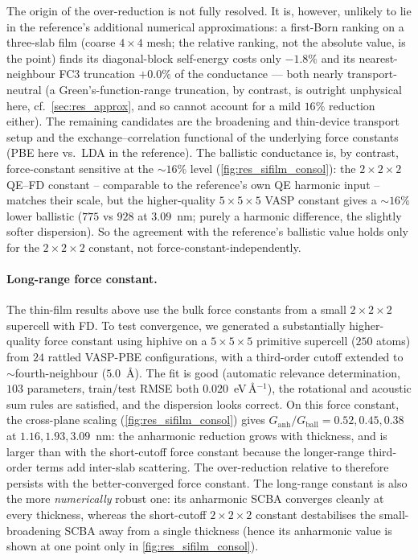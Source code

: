 The origin of the over-reduction is not fully resolved. It is, however,
unlikely to lie in the reference's additional numerical approximations: a
first-Born ranking on a three-slab film (coarse $4\times4$ mesh; the relative
ranking, not the absolute value, is the point) finds its diagonal-block
self-energy costs only
$-1.8\%$ and its nearest-neighbour FC3 truncation $+0.0\%$ of the conductance
--- both nearly transport-neutral (a Green's-function-range truncation, by
contrast, is outright unphysical here, cf.\ \cref{sec:res_approx}, and so cannot
account for a mild $16\%$ reduction either). The remaining candidates are the broadening and thin-device
transport setup and the exchange--correlation functional of the underlying
force constants (PBE here vs.\ LDA in the reference). The ballistic conductance is, by contrast,
force-constant sensitive at the $\sim16\%$ level (\cref{fig:res_sifilm_consol}):
the $2\times2\times2$ QE--FD constant -- comparable to the reference's own
QE harmonic input -- matches their scale, but the higher-quality
$5\times5\times5$ VASP constant gives a $\sim16\%$ lower ballistic ($775$ vs
$928$ at $3.09$~nm; purely
a harmonic difference, the slightly softer dispersion). So the agreement
with the reference's ballistic value holds only for the $2\times2\times2$
constant, not force-constant-independently.

\paragraph{Long-range force constant.} The thin-film
results above use the bulk force constants from a small
$2\times2\times2$ supercell with FD. To test convergence, we generated a substantially
higher-quality force constant using hiphive on a $5\times5\times5$
primitive supercell ($250$ atoms) from $24$ rattled
VASP-PBE configurations, with a third-order cutoff extended to
$\sim$fourth-neighbour ($5.0$~\AA). The fit is good (automatic
relevance determination, $103$ parameters, train/test RMSE both
$0.020$~eV\,\AA$^{-1}$), the rotational and acoustic sum rules are
satisfied, and the dispersion looks correct. On this force
constant, the cross-plane scaling (\cref{fig:res_sifilm_consol}) gives
$G_\mathrm{anh}/G_\mathrm{ball}=0.52,0.45,0.38$ at $1.16,1.93,3.09$~nm:
the anharmonic reduction grows with thickness,
and is larger than with the short-cutoff force constant because
the longer-range third-order terms add inter-slab scattering. The
over-reduction relative to \citet{guo_quantum_2020} therefore persists with the
better-converged force constant. The long-range constant is also the more
\emph{numerically} robust one: its anharmonic SCBA converges cleanly at
every thickness, whereas the short-cutoff $2\times2\times2$ constant
destabilises the small-broadening SCBA away from a single thickness
(hence its anharmonic value is shown at one point only in
\cref{fig:res_sifilm_consol}).

